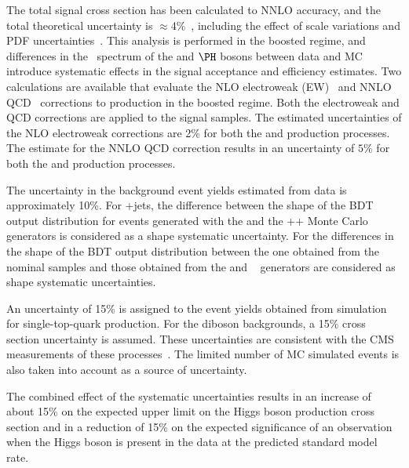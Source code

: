 \documentclass[11pt,twoside,a4paper,cmspaper,final,collab]{cms-tdr}
\begin{document}
The total \VH signal cross section has
been calculated to NNLO accuracy,
and the total theoretical uncertainty is $\approx$4\%~\cite{Dittmaier:2012vm}, including
the effect of scale variations and PDF uncertainties~\cite{Alekhin:2011sk,Botje:2011sn,Lai:2010vv,Martin:2009iq,Ball:2011mu}. This analysis is performed
       in the boosted regime, and differences in
       the \pt\ spectrum of the \Vvar and $\PH$ bosons between data and
       MC introduce systematic effects in the
       signal acceptance and efficiency estimates.  Two
       calculations are available that evaluate the NLO
       electroweak (EW)~\cite{HAWK1,HAWK2,HAWK3} and NNLO QCD~\cite{Ferrera:2011bk}
       corrections to \VH production in the boosted regime. Both the electroweak and
       QCD corrections are applied to the signal samples. The estimated uncertainties of the NLO electroweak corrections
       are 2\% for both the \ZH and \WH production processes.
       The estimate for the NNLO QCD correction results in an uncertainty of $5\%$ for both the \ZH and \WH production
       processes.


The uncertainty in the background event yields
estimated from data is approximately 10\%. For {\Vvar}+jets, the
difference between the shape of the BDT output distribution for events generated
with the {\MADGRAPH} and the {\HERWIG++} Monte Carlo generators is
considered as a shape systematic uncertainty.
For \ttbar the differences in the shape of the BDT output distribution
between the one obtained from the nominal {\MADGRAPH}
samples and those obtained from the {\POWHEG} and {\MCATNLO}~\cite{Frixione:2002ik} generators are  considered as shape
systematic uncertainties.


An uncertainty of 15\% is assigned to the event yields obtained
from simulation for single-top-quark
production. For the diboson backgrounds, a 15\% cross section
uncertainty is assumed.
These uncertainties are consistent with the CMS measurements
of these processes~\cite{Chatrchyan:2012ep,Chatrchyan:2013oev}.
The limited number of MC simulated events
is also taken into account as a source of uncertainty.

The combined effect of the systematic uncertainties results in an
increase of about 15\% on the expected upper limit on the Higgs boson production
cross section and in a reduction of 15\%  on
the expected significance of an observation when the Higgs boson is
present in the data at the predicted standard model rate.
\end{document}
